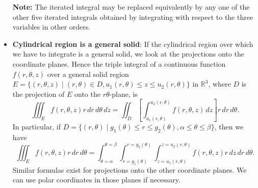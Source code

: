 \documentclass{report}
\begin{document}
\begin{itemize}
\[            \]
            \bigbreak \noindent 
            \textbf{Note:} The iterated integral may be replaced equivalently by any one of the other five iterated integrals obtained by integrating with respect to the three variables in other orders.
        \item \textbf{Cylindrical region is a general solid}:
            If the cylindrical region over which we have to integrate is a general solid, we look at the projections onto the coordinate planes. Hence the triple integral of a continuous function \(f(r, \theta, z)\) over a general solid region \(E = \{(r, \theta, z) \mid (r, \theta) \in D, u_1(r, \theta) \leq z \leq u_2(r, \theta)\}\) in \(\mathbb{R}^3\), where \(D\) is the projection of \(E\) onto the \(r\theta\)-plane, is
            \[
                \iiint_E f(r, \theta, z) r \, dr \, d\theta \, dz = \iint_D \left[ \int_{u_1(r, \theta)}^{u_2(r, \theta)} f(r, \theta, z) \, dz \right] r \, dr \, d\theta.
            \]
            In particular, if \(D = \{(r, \theta) \mid g_1(\theta) \leq r \leq g_2(\theta), \alpha \leq \theta \leq \beta\}\), then we have
            \[
                \iiint_E f(r, \theta, z) r \, dr \, d\theta = \int_{\theta=\alpha}^{\theta=\beta} \int_{r=g_1(\theta)}^{r=g_2(\theta)} \int_{z=u_1(r, \theta)}^{z=u_2(r, \theta)} f(r, \theta, z) r \, dz \, dr \, d\theta.
            \]
            Similar formulas exist for projections onto the other coordinate planes. We can use polar coordinates in those planes if necessary.


\end{itemize}
\end{document}

